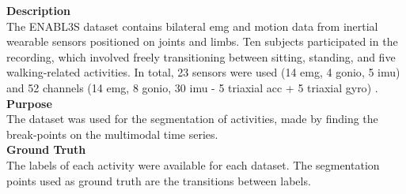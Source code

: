 \textbf{Description}\\
The ENABL3S dataset contains bilateral \gls{emg} and motion data from inertial wearable sensors positioned on joints and limbs. Ten subjects participated in the recording, which involved freely transitioning between sitting, standing, and five walking-related activities. In total, 23 sensors were used (14 \gls{emg}, 4 \gls{gonio}, 5 \gls{imu}) and 52 channels (14 \gls{emg}, 8 \gls{gonio}, 30 \gls{imu} - 5 triaxial \gls{acc} + 5 triaxial \gls{gyro}) \cite{enables}.\\
\textbf{Purpose}\\
The dataset was used for the segmentation of activities, made by finding the break-points on the multimodal time series.\\
\textbf{Ground Truth}\\
The labels of each activity were available for each dataset. The segmentation points used as ground truth are the transitions between labels.

